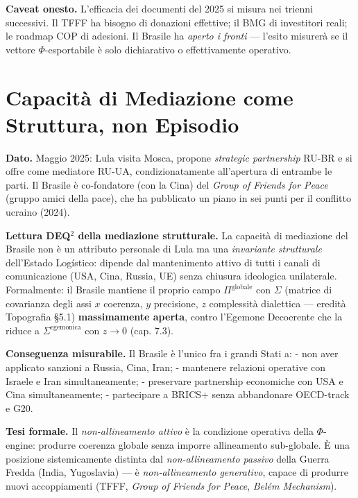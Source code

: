 \Conj{} \textbf{Caveat onesto.} L'efficacia dei documenti del 2025 si
misura nei trienni successivi. Il TFFF ha bisogno di donazioni
effettive; il BMG di investitori reali; le roadmap COP di adesioni. Il
Brasile ha \emph{aperto i fronti} --- l'esito misurerà se il vettore
\(\Phi\)-esportabile è solo dichiarativo o effettivamente operativo.



\section{Capacità di Mediazione come Struttura, non
Episodio}\label{capacituxe0-di-mediazione-come-struttura-non-episodio}

\Proved{} \textbf{Dato.} Maggio 2025: Lula visita Mosca, propone
\emph{strategic partnership} RU-BR e si offre come mediatore RU-UA,
condizionatamente all'apertura di entrambe le parti. Il Brasile è
co-fondatore (con la Cina) del \emph{Group of Friends for Peace} (gruppo
amici della pace), che ha pubblicato un piano in sei punti per il
conflitto ucraino (2024).

\Hypoth{} \textbf{Lettura DEQ$^2$ della mediazione strutturale.} La
capacità di mediazione del Brasile non è un attributo personale di Lula
ma una \emph{invariante strutturale} dell'Estado Logístico: dipende dal
mantenimento attivo di tutti i canali di comunicazione (USA, Cina,
Russia, UE) senza chiusura ideologica unilaterale. Formalmente: il
Brasile mantiene il proprio campo \(\Pi^{\text{globale}}\) con
\(\Sigma\) (matrice di covarianza degli assi \(x\) coerenza, \(y\)
precisione, \(z\) complessità dialettica --- eredità Topografia \S{}5.1)
\textbf{massimamente aperta}, contro l'Egemone Decoerente che la riduce
a \(\Sigma^{\text{egemonica}}\) con \(z \to 0\) (cap. 7.3).

\Proved{} \textbf{Conseguenza misurabile.} Il Brasile è l'unico fra i
grandi Stati a: - non aver applicato sanzioni a Russia, Cina, Iran; -
mantenere relazioni operative con Israele e Iran simultaneamente; -
preservare partnership economiche con USA e Cina simultaneamente; -
partecipare a BRICS+ senza abbandonare OECD-track e G20.

\Hypoth{} \textbf{Tesi formale.} Il \emph{non-allineamento attivo} è la
condizione operativa della \(\Phi\)-engine: produrre coerenza globale
senza imporre allineamento sub-globale. È una posizione sistemicamente
distinta dal \emph{non-allineamento passivo} della Guerra Fredda (India,
Yugoslavia) --- è \emph{non-allineamento generativo}, capace di produrre
nuovi accoppiamenti (TFFF, \emph{Group of Friends for Peace},
\emph{Belém Mechanism}).



